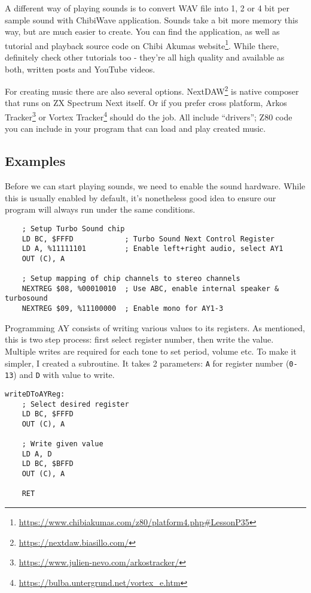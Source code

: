 \documentclass[12pt,twoside,openright,a4paper]{book}
\begin{document}
A different way of playing sounds is to convert WAV file into 1, 2 or 4 bit per sample sound with ChibiWave application. Sounds take a bit more memory this way, but are much easier to create. You can find the application, as well as tutorial and playback source code on Chibi Akumas website\footnote{\url{https://www.chibiakumas.com/z80/platform4.php#LessonP35}}. While there, definitely check other tutorials too - they're all high quality and available as both, written posts and YouTube videos.

For creating music there are also several options. NextDAW\footnote{\url{https://nextdaw.biasillo.com/}} is native composer that runs on ZX Spectrum Next itself. Or if you prefer cross platform, Arkos Tracker\footnote{\url{https://www.julien-nevo.com/arkostracker/}} or Vortex Tracker\footnote{\url{https://bulba.untergrund.net/vortex_e.htm}} should do the job. All include ``drivers''; Z80 code you can include in your program that can load and play created music.


\pagebreak
\subsection{Examples}

Before we can start playing sounds, we need to enable the sound hardware. While this is usually enabled by default, it's nonetheless good idea to ensure our program will always run under the same conditions.

\begin{lstlisting}
	; Setup Turbo Sound chip
	LD BC, $FFFD            ; Turbo Sound Next Control Register
	LD A, %11111101         ; Enable left+right audio, select AY1
	OUT (C), A
	
	; Setup mapping of chip channels to stereo channels
	NEXTREG $08, %00010010  ; Use ABC, enable internal speaker & turbosound
	NEXTREG $09, %11100000  ; Enable mono for AY1-3
\end{lstlisting}

Programming AY consists of writing various values to its registers. As mentioned, this is two step process: first select register number, then write the value. Multiple writes are required for each tone to set period, volume etc. To make it simpler, I created a subroutine. It takes 2 parameters: {\tt A} for register number ({\tt 0-13}) and {\tt D} with value to write.

\begin{lstlisting}
writeDToAYReg:
	; Select desired register
	LD BC, $FFFD
	OUT (C), A
	
	; Write given value
	LD A, D
	LD BC, $BFFD
	OUT (C), A
	
	RET
\end{lstlisting}
\end{document}
